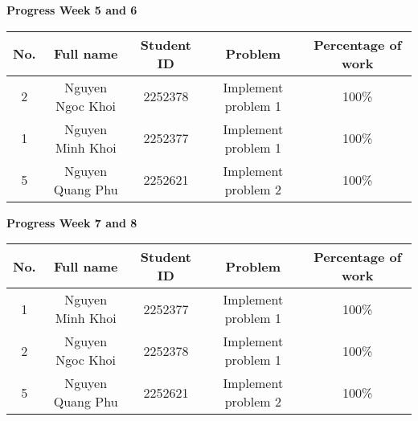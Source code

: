 \vspace{1em}

\begin{center}
    {\textbf{\huge Progress Week 5 and 6}}
\end{center}
\begin{center}
\renewcommand{\arraystretch}{1.5}
\begin{tabular}{||c|c|c|c|c||}
\hline
\multirow{1}{*}{\textbf{No.}} & \multirow{1}{*}{\textbf{Full name}} & \multirow{1}{*}{\textbf{Student ID}} & \multirow{1}{*}{\textbf{Problem}} & \multirow{1}{*}{\textbf{Percentage of work}}\\
\hline
\multirow{1}{*}{2} & \multirow{1}{*}{Nguyen Ngoc Khoi} & \multirow{1}{*}{2252378} & \multirow{1}{*}{Implement problem 1} & \multirow{1}{*}{100\%}\\
\hline
\multirow{1}{*}{1} & \multirow{1}{*}{Nguyen Minh Khoi} & \multirow{1}{*}{2252377} & \multirow{1}{*}{Implement problem 1} & \multirow{1}{*}{100\%}\\
\hline
\multirow{1}{*}{5} & \multirow{1}{*}{Nguyen Quang Phu} & \multirow{1}{*}{2252621} & \multirow{1}{*}{Implement problem 2} & \multirow{1}{*}{100\%}\\
\hline
\end{tabular}
\end{center}

\vspace{2cm}

\begin{center}
    {\textbf{\huge Progress Week 7 and 8}}
\end{center}
\begin{center}
\renewcommand{\arraystretch}{1.5}
\begin{tabular}{||c|c|c|c|c||}
\hline
\multirow{1}{*}{\textbf{No.}} & \multirow{1}{*}{\textbf{Full name}} & \multirow{1}{*}{\textbf{Student ID}} & \multirow{1}{*}{\textbf{Problem}} & \multirow{1}{*}{\textbf{Percentage of work}}\\
\hline
\multirow{1}{*}{1} & \multirow{1}{*}{Nguyen Minh Khoi} & \multirow{1}{*}{2252377} & \multirow{1}{*}{Implement problem 1} & \multirow{1}{*}{100\%}\\
\hline
\multirow{1}{*}{2} & \multirow{1}{*}{Nguyen Ngoc Khoi} & \multirow{1}{*}{2252378} & \multirow{1}{*}{Implement problem 1} & \multirow{1}{*}{100\%}\\
\hline
\multirow{1}{*}{5} & \multirow{1}{*}{Nguyen Quang Phu} & \multirow{1}{*}{2252621} & \multirow{1}{*}{Implement problem 2} & \multirow{1}{*}{100\%}\\
\hline
\end{tabular}
\end{center}

\newpage
